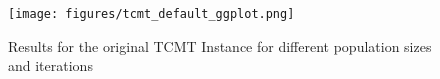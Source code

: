 \documentclass[10pt]{scrartcl}
\begin{document}

\begin{figure}
    \centering
    \texttt{[image: figures/tcmt\_default\_ggplot.png]}
    \caption{Results for the original TCMT Instance for different population sizes and iterations}
    \label{fig:default_results}
\end{figure}
\end{document}
